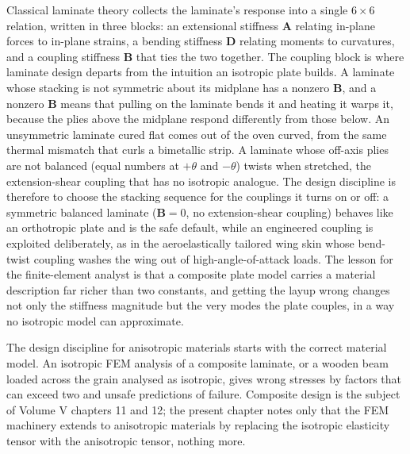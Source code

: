 Classical laminate theory collects the laminate's response into a single
$6\times 6$ relation, written in three blocks: an extensional stiffness
$\mathbf{A}$ relating in-plane forces to in-plane strains, a bending
stiffness $\mathbf{D}$ relating moments to curvatures, and a coupling
stiffness $\mathbf{B}$ that ties the two together. The coupling block is
where laminate design departs from the intuition an isotropic plate builds.
A laminate whose stacking is not symmetric about its midplane has a nonzero
$\mathbf{B}$, and a nonzero $\mathbf{B}$ means that pulling on the laminate
bends it and heating it warps it, because the plies above the midplane
respond differently from those below. An unsymmetric laminate cured flat
comes out of the oven curved, from the same thermal mismatch that curls a
bimetallic strip. A laminate whose off-axis plies are not balanced (equal
numbers at $+\theta$ and $-\theta$) twists when stretched, the
extension-shear coupling that has no isotropic analogue. The design
discipline is therefore to choose the stacking sequence for the couplings it
turns on or off: a symmetric balanced laminate ($\mathbf{B}=0$, no
extension-shear coupling) behaves like an orthotropic plate and is the safe
default, while an engineered coupling is exploited deliberately, as in the
aeroelastically tailored wing skin whose bend-twist coupling washes the wing
out of high-angle-of-attack loads. The lesson for the finite-element analyst
is that a composite plate model carries a material description far richer
than two constants, and getting the layup wrong changes not only the
stiffness magnitude but the very modes the plate couples, in a way no
isotropic model can approximate.

The design discipline for anisotropic materials starts with the
correct material model. An isotropic FEM analysis of a composite
laminate, or a wooden beam loaded across the grain analysed as
isotropic, gives wrong stresses by factors that can exceed two and
unsafe predictions of failure. Composite design is the subject of
Volume V chapters 11 and 12; the present chapter notes only that
the FEM machinery extends to anisotropic materials by replacing
the isotropic elasticity tensor with the anisotropic tensor,
nothing more.

